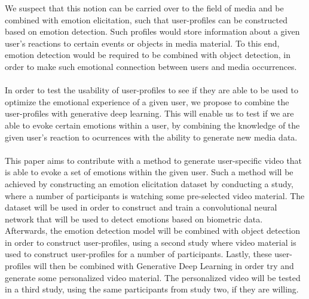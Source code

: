 We suspect that this notion can be carried over to the field of media and 
be combined with emotion elicitation, such that user-profiles can be constructed based on emotion detection. Such profiles would store information about a given user's reactions to certain events or objects in media material.
To this end, emotion detection would be required to be combined with object detection, in order to make such emotional connection between users and media occurrences\cite{WhatIsObjectDetection}.
\\ \\
In order to test the usability of user-profiles to see if they are able to be used to optimize the emotional experience of a given user, we propose to combine the user-profiles with generative deep learning. This will enable us to test if we are able to evoke certain emotions within a user, by combining the knowledge of the given user's reaction to ocurrences with the ability to generate new media data. 
\\ \\
This paper aims to contribute with a method to generate user-specific video that is able to evoke a set of emotions within the given user. 
Such a method will be achieved by constructing an emotion elicitation dataset by conducting a study, where a number of participants is watching some pre-selected video material. The dataset will be used in order to construct and train a convolutional neural network that will be used to detect emotions based on biometric data.
Afterwards, the emotion detection model will be combined with object detection in order to construct user-profiles, using a second study where video material is used to construct user-profiles for a number of participants. Lastly, these user-profiles will then be combined with Generative Deep Learning in order try and generate some personalized video material. The personalized video will be tested in a third study, using the same participants from study two, if they are willing. 




